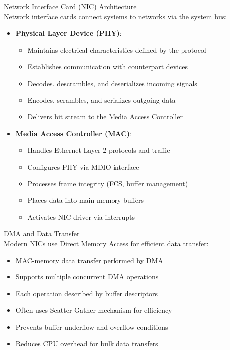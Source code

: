 \begin{definition}{Network Interface Card (NIC) Architecture}\\
    Network interface cards connect systems to networks via the system bus:
    \begin{itemize}
        \item \textbf{Physical Layer Device (PHY)}:
            \begin{itemize}
                \item Maintains electrical characteristics defined by the protocol
                \item Establishes communication with counterpart devices
                \item Decodes, descrambles, and deserializes incoming signals
                \item Encodes, scrambles, and serializes outgoing data
                \item Delivers bit stream to the Media Access Controller
            \end{itemize}
        \item \textbf{Media Access Controller (MAC)}:
            \begin{itemize}
                \item Handles Ethernet Layer-2 protocols and traffic
                \item Configures PHY via MDIO interface
                \item Processes frame integrity (FCS, buffer management)
                \item Places data into main memory buffers
                \item Activates NIC driver via interrupts
            \end{itemize}
    \end{itemize}
\end{definition}



\begin{concept}{DMA and Data Transfer}\\
    Modern NICs use Direct Memory Access for efficient data transfer:
    \begin{itemize}
        \item MAC-memory data transfer performed by DMA
        \item Supports multiple concurrent DMA operations
        \item Each operation described by buffer descriptors
        \item Often uses Scatter-Gather mechanism for efficiency
        \item Prevents buffer underflow and overflow conditions
        \item Reduces CPU overhead for bulk data transfers
    \end{itemize}
\end{concept}

